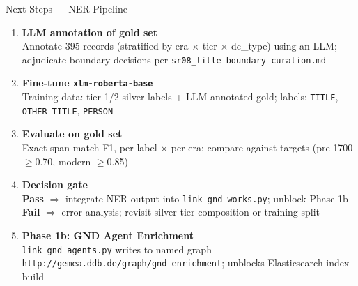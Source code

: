 \documentclass[xcolor,aspectratio=169,compress]{beamer}
\begin{document}
\begin{frame}{Next Steps --- NER Pipeline}
  \small
  \begin{enumerate}\setlength{\itemsep}{5pt}
    \item \textbf{LLM annotation of gold set} \\
          Annotate 395 records (stratified by era $\times$ tier $\times$ dc\_type) using an LLM;
          adjudicate boundary decisions per \texttt{sr08\_title-boundary-curation.md}

    \item \textbf{Fine-tune \texttt{xlm-roberta-base}} \\
          Training data: tier-1/2 silver labels + LLM-annotated gold;
          labels: \texttt{TITLE}, \texttt{OTHER\_TITLE}, \texttt{PERSON}

    \item \textbf{Evaluate on gold set} \\
          Exact span match F1, per label $\times$ per era;
          compare against targets (pre-1700 $\geq$0.70, modern $\geq$0.85)

    \item \textbf{Decision gate} \\
          \textbf{Pass} $\Rightarrow$ integrate NER output into \texttt{link\_gnd\_works.py}; unblock Phase 1b \\
          \textbf{Fail} $\Rightarrow$ error analysis; revisit silver tier composition or training split

    \item \textbf{Phase 1b: GND Agent Enrichment} \\
          \texttt{link\_gnd\_agents.py} writes to named graph \texttt{http://gemea.ddb.de/graph/gnd-enrichment};
          unblocks Elasticsearch index build
  \end{enumerate}
\end{frame}
\end{document}
